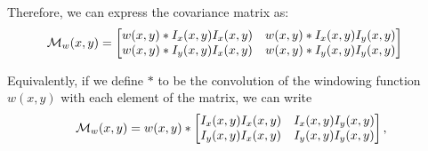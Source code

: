 \begin{Answer}
  \step
  Therefore, we can express the covariance matrix as:
  \begin{align}
    \mathcal{M}_w(x,y) &= 
    \begin{bmatrix}
      w(x, y) \ast I_x(x,y)I_x(x,y) & w(x, y) \ast I_x(x,y)I_y(x,y)\\
      w(x, y) \ast I_y(x,y)I_x(x,y) & w(x, y) \ast I_y(x,y)I_y(x,y)
    \end{bmatrix}
  \end{align}

  \step
  Equivalently, if we define $\ast$ to be the convolution of the
  windowing function $w(x,y)$ with each element of the matrix,
  we can write 
  \begin{equation}
    {\mathcal{M}}_w(x,y) = w(x,y)
      \ast
      \begin{bmatrix}
        I_x(x,y)I_x(x,y) & I_x(x,y)I_y(x,y)\\
        I_y(x,y)I_x(x,y) & I_y(x,y)I_y(x,y)
      \end{bmatrix},
  \end{equation}
\end{Answer}
